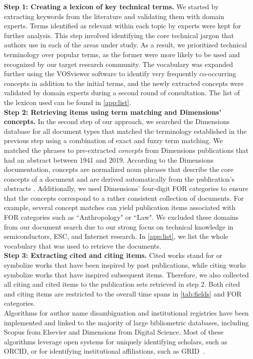 \documentclass[draft,final]{vutinfth} %
\begin{document}
\textbf{Step 1: Creating a lexicon of key technical terms.}
\noindent
We started by extracting keywords from the literature and validating them with domain experts. Terms identified as relevant within each topic by experts were kept for further analysis. 
This step involved identifying the core technical jargon that authors use in each of the areas under study. 
As a result, we prioritized technical terminology over popular terms, as the former were more likely to be used and recognized by our target research community. 
The vocabulary was expanded further using the VOSviewer software \cite{van2010software} to identify very frequently co-occurring concepts in addition to the initial terms, and the newly extracted concepts were validated by domain experts during a second round of consultation.
The list of the lexicon used can be found in \ref{app:list}.\\[2mm]
%
\textbf{Step 2: Retrieving items using term matching and Dimensions' concepts.}
In the second step of our approach, we searched the Dimensions database for all document types that matched the terminology established in the previous step using a combination of exact and fuzzy term matching. We matched the phrases to pre-extracted \textit{concepts} from Dimensions publications that had an abstract between 1941 and 2019. According to the Dimensions documentation, concepts are normalized noun phrases that describe the core concepts of a document and are derived automatically from the publication's abstracts \cite{Dimensions-Concepts}. Additionally, we used Dimensions' four-digit FOR categories %
to ensure that the concepts correspond to a rather consistent collection of documents. For example, several concept matches can yield publication items associated with FOR categories such as ``Anthropology" or ``Law". We excluded these domains from our document search due to our strong focus on technical knowledge in semiconductors, ESC, and Internet research. 
In \ref{app:list}, we list the whole vocabulary that was used to retrieve the documents.\\[2mm]
\textbf{Step 3:  Extracting cited and citing items.}
Cited works stand for or symbolize works that have been inspired by past publications, while citing works symbolize works that have inspired subsequent items. Therefore, we also collected all citing and cited items to the publication sets retrieved in step 2. Both cited and citing items are restricted to the overall time spans in \ref{tab:fields} and FOR categories.\\[2mm]
%
Algorithms for author name disambiguation and institutional registries have been implemented and linked to the majority of large bibliometric databases, including Scopus from Elsevier and Dimensions from Digital Science. 
Most of these algorithms leverage open systems for uniquely identifying scholars, such as ORCID, or for identifying institutional affiliations, such as GRID~\cite{machavcek2021researchers}. 
\end{document}
